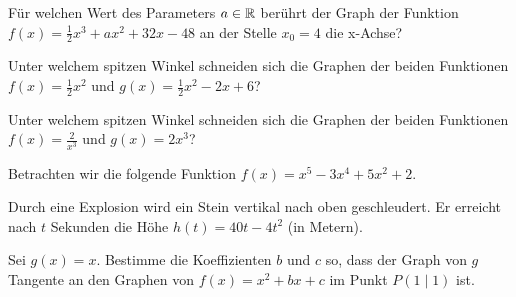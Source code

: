 \documentclass[11pt]{exam}
\begin{document}
\begin{questions}
\question[4] %
Für welchen Wert des Parameters $a\in\mathbb{R}$ berührt der Graph der Funktion $f(x)=\frac{1}{2}x^3+ax^2+32x-48$ an der Stelle $x_0=4$ die x-Achse?


\question[4] %
Unter welchem spitzen Winkel schneiden sich die Graphen der beiden Funktionen $f(x)=\frac{1}{2}x^2$ und $g(x)=\frac{1}{2}x^2-2x+6$?

\question[4] %
Unter welchem spitzen Winkel schneiden sich die Graphen der beiden Funktionen $f(x)=\frac{2}{x^3}$ und $g(x)=2x^3$?


\noaddpoints
\question[\totalpoints]
\addpoints
Betrachten wir die folgende Funktion $f(x)=x^5-3x^4+5x^2+2$.


\noaddpoints
\question[\totalpoints] %
\addpoints
Durch eine Explosion wird ein Stein vertikal nach oben geschleudert. Er erreicht nach $t$ Sekunden die Höhe $h(t)=40t-4t^2$ (in Metern).

\question[4] %
Sei $g(x)=x$. Bestimme die Koeffizienten $b$ und $c$ so, dass der Graph von $g$ Tangente an den Graphen von $f(x)=x^2+bx+c$ im Punkt $P(1\;\vert\;1)$ ist.



\end{questions}
\end{document}
